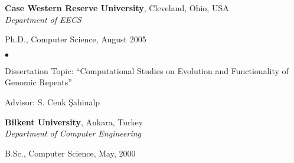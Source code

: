 \documentclass[margin,line]{res}
\newenvironment{list1}{
  \begin{list}{\ding{113}}{%
      \setlength{\itemsep}{0in}
      \setlength{\parsep}{0in} \setlength{\parskip}{0in}
      \setlength{\topsep}{0in} \setlength{\partopsep}{0in} 
      \setlength{\leftmargin}{0.17in}}}{\end{list}}
\newenvironment{list2}{
  \begin{list}{$\bullet$}{%
      \setlength{\itemsep}{0in}
      \setlength{\parsep}{0in} \setlength{\parskip}{0in}
      \setlength{\topsep}{0in} \setlength{\partopsep}{0in} 
      \setlength{\leftmargin}{0.2in}}}{\end{list}}
\newcommand{\junk}[1]{}
\begin{document}
\begin{resume}
          {\bf Case Western Reserve University}, Cleveland, Ohio, USA\\
          {\em Department of EECS} \\
          \vspace*{-.1in}
          \begin{list1}
          \item[] Ph.D., Computer Science, August 2005
            \begin{list2}
              \vspace*{.05in}
            \item Dissertation Topic:  ``Computational Studies on Evolution and Functionality of Genomic Repeats''
            \item Advisor:  S. Cenk \c{S}ahinalp
            \end{list2}
          \end{list1}
          
          {\bf Bilkent University}, Ankara, Turkey \\
          {\em Department of Computer Engineering}\\ 
          \vspace*{-.1in}
          \begin{list1}
          \item[] B.Sc., Computer Science,  May, 2000
          \end{list1}
          
          \junk{
            \section{\sc Academic Experience}
                    {\bf Case Western Reserve University}, Cleveland, Ohio, USA\\
                    
                    \vspace{-.2cm}
                           {\em Graduate Student \& Research Assistant} \hfill {\bf August, 2000
                             - August 2005}\\
                           Included  Ph.D.~research, Ph.D. level course work and
                           research projects, reviewing papers for bioinformatics, algorithms and
                           database conferences and journals.
                           
                           {\em Teaching Assistant} \hfill {\bf August, 2000  - May 2001}\\
                           Duties included grading homeworks, and office hours. 
                           \begin{list2}
                           \item Systems Programming, Fall 2000
                           \item Introduction to Bioinformatics, Fall 2001
                           \item Analysis of Algorithms, Spring 2001
                           \end{list2}
          }
          

\end{resume}
\end{document}
